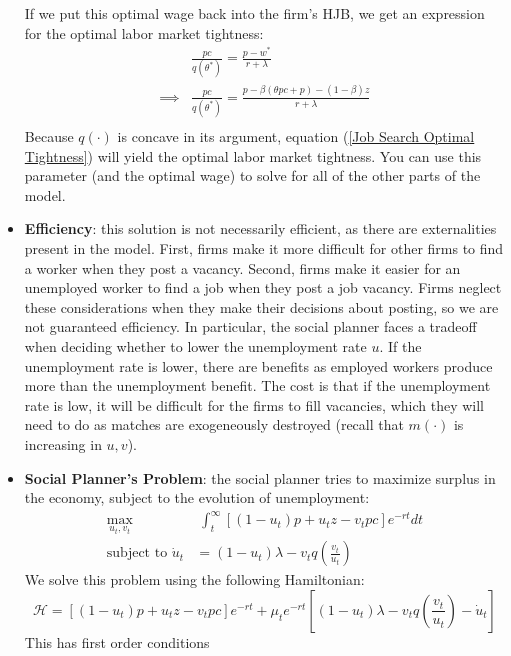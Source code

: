 \documentclass[12pt]{article}
\begin{document}
\begin{itemize}
    If we put this optimal wage back into the firm's HJB, we get an expression for the optimal labor market tightness:
    \begin{equation}\label{Job Search Optimal Tightness}
        \begin{split}
            &\frac{pc}{q(\theta^*)} = \frac{p-w^*}{r+\lambda} \\
            \implies &\frac{pc}{q(\theta^*)} = \frac{p-\beta (\theta pc + p) - (1-\beta)z}{r+\lambda} \\
        \end{split}
    \end{equation}
    Because $q(\cdot)$ is concave in its argument, equation (\ref{Job Search Optimal Tightness}) will yield the optimal labor market tightness. You can use this parameter (and the optimal wage) to solve for all of the other parts of the model.
    \item \textbf{Efficiency}: this solution is not necessarily efficient, as there are externalities present in the model. First, firms make it more difficult for other firms to find a worker when they post a vacancy. Second, firms make it easier for an unemployed worker to find a job when they post a job vacancy. Firms neglect these considerations when they make their decisions about posting, so we are not guaranteed efficiency. In particular, the social planner faces a tradeoff when deciding whether to lower the unemployment rate $u$. If the unemployment rate is lower, there are benefits as employed workers produce more than the unemployment benefit. The cost is that if the unemployment rate is low, it will be difficult for the firms to fill vacancies, which they will need to do as matches are exogeneously destroyed (recall that $m(\cdot)$ is increasing in $u,v$).
    \item \textbf{Social Planner's Problem}: the social planner tries to maximize surplus in the economy, subject to the evolution of unemployment:
    \[\begin{split}
        \max_{u_t,v_t}&\;\int_t^{\infty}\left[(1-u_t)p + u_tz - v_tpc\right]e^{-rt}dt \\
        \text{subject to }\dot{u}_t &= (1-u_t)\lambda - v_tq\left(\frac{v_t}{u_t}\right)
    \end{split}\]
    We solve this problem using the following Hamiltonian:
    \[\mathcal{H} = \left[(1-u_t)p + u_tz - v_tpc\right]e^{-rt} + \mu_te^{-rt}\left[(1-u_t)\lambda - v_tq\left(\frac{v_t}{u_t}\right) - \dot{u}_t\right]\]
    This has first order conditions
    \[\begin{split}

\end{split}\]
\end{itemize}
\end{document}
